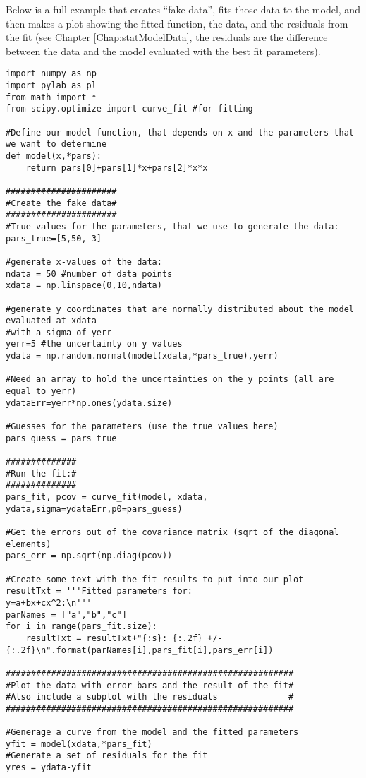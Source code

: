 Below is a full example that creates ``fake data'', fits those data to the model, and then makes a plot showing the fitted function, the data, and the residuals from the fit (see Chapter \ref{Chap:statModelData}, the residuals are the difference between the data and the model evaluated with the best fit parameters).
\begin{lstlisting}[frame=single] 
import numpy as np
import pylab as pl
from math import *
from scipy.optimize import curve_fit #for fitting

#Define our model function, that depends on x and the parameters that we want to determine
def model(x,*pars):
    return pars[0]+pars[1]*x+pars[2]*x*x

######################
#Create the fake data#
######################
#True values for the parameters, that we use to generate the data:
pars_true=[5,50,-3]

#generate x-values of the data:
ndata = 50 #number of data points
xdata = np.linspace(0,10,ndata)

#generate y coordinates that are normally distributed about the model evaluated at xdata
#with a sigma of yerr
yerr=5 #the uncertainty on y values
ydata = np.random.normal(model(xdata,*pars_true),yerr)

#Need an array to hold the uncertainties on the y points (all are equal to yerr)
ydataErr=yerr*np.ones(ydata.size)

#Guesses for the parameters (use the true values here)
pars_guess = pars_true

##############
#Run the fit:#
##############
pars_fit, pcov = curve_fit(model, xdata, ydata,sigma=ydataErr,p0=pars_guess)

#Get the errors out of the covariance matrix (sqrt of the diagonal elements)
pars_err = np.sqrt(np.diag(pcov))

#Create some text with the fit results to put into our plot
resultTxt = '''Fitted parameters for:
y=a+bx+cx^2:\n'''
parNames = ["a","b","c"]
for i in range(pars_fit.size):
    resultTxt = resultTxt+"{:s}: {:.2f} +/- {:.2f}\n".format(parNames[i],pars_fit[i],pars_err[i])

#########################################################    
#Plot the data with error bars and the result of the fit#
#Also include a subplot with the residuals              #
#########################################################

#Generage a curve from the model and the fitted parameters
yfit = model(xdata,*pars_fit)
#Generate a set of residuals for the fit
yres = ydata-yfit


\end{lstlisting}
